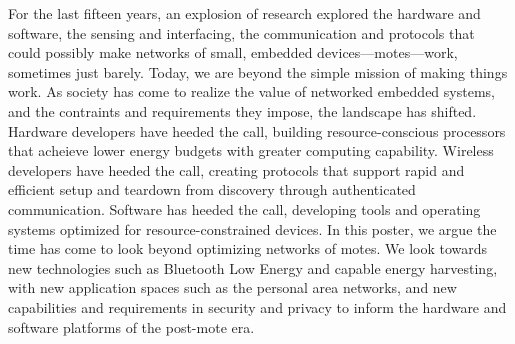 
For the last fifteen years, an explosion of research explored the hardware and
software, the sensing and interfacing, the communication and protocols that
could possibly make networks of small, embedded devices---motes---work,
sometimes just barely.
%
Today, we are beyond the simple mission of making things work. As society
has come to realize the value of networked embedded systems, and
the contraints and requirements they impose, the landscape has shifted.
Hardware developers have heeded the call, building resource-conscious
processors that acheieve lower energy budgets with greater computing
capability. Wireless developers have heeded the call, creating protocols that
support rapid and efficient setup and teardown from discovery through
authenticated communication. Software has heeded the call, developing tools
and operating systems optimized for resource-constrained devices.
%
In this poster, we argue the time has come to look beyond optimizing networks
of motes. We look towards new technologies such as Bluetooth Low Energy and
capable energy harvesting, with new application spaces such as the personal
area networks, and new capabilities and requirements in security and privacy
to inform the hardware and software platforms of the post-mote era.

